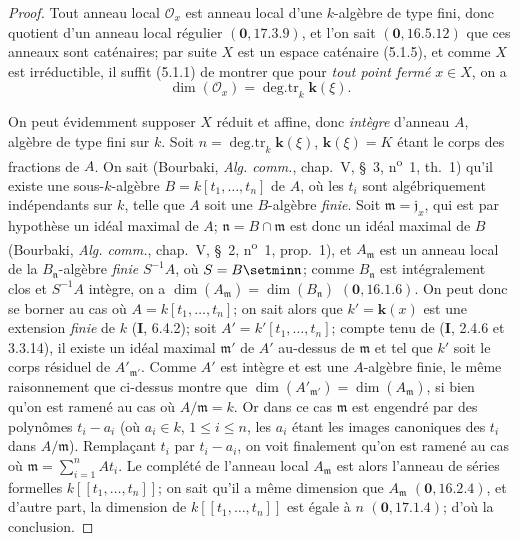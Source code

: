 \begin{proof}
Tout anneau local $\mathcal O_x$ est anneau local d'une $k$-algèbre de type
fini, donc quotient d'un anneau local régulier $(\mathbf{0},17.3.9)$, et l'on sait
$(\mathbf{0},16.5.12)$ que ces anneaux sont caténaires; par suite $X$ est un espace
caténaire (5.1.5), et comme $X$ est irréductible, il suffit (5.1.1) de montrer
que pour \emph{tout point fermé} $x\in X$, on a
\begin{equation}
\dim(\mathcal O_x)=\operatorname{deg.tr}_k \boldsymbol{k}(\xi).
\tag{5.2.1.1}\label{IV.2.5.2.1.1-fr}
\end{equation}

On peut évidemment supposer $X$ réduit et affine, donc \emph{intègre}
d'anneau $A$, algèbre de type fini sur $k$. Soit
$n=\operatorname{deg.tr}_k \boldsymbol{k}(\xi)$, $\boldsymbol{k}(\xi)=K$ étant le corps des fractions
de $A$. On sait (Bourbaki, \emph{Alg. comm.}, chap.~V, \S~3,
n\textsuperscript{o}~1, th.~1) qu'il existe une sous-$k$-algèbre
$B=k[t_1,\ldots,t_n]$ de $A$, où les $t_i$ sont algébriquement indépendants
sur $k$, telle que $A$ soit une $B$-algèbre \emph{finie}. Soit
$\mathfrak m=\mathfrak j_x$, qui est par hypothèse un idéal maximal de $A$;
$\mathfrak n=B\cap\mathfrak m$ est donc un idéal maximal de $B$ (Bourbaki,
\emph{Alg. comm.}, chap.~V, \S~2, n\textsuperscript{o}~1, prop.~1), et
$A_{\mathfrak m}$ est un anneau local de la $B_{\mathfrak n}$-algèbre
\emph{finie} $S^{-1}A$, où $S=B\setmin\mathfrak n$; comme $B_{\mathfrak n}$ est
intégralement clos et $S^{-1}A$ intègre, on a
$\dim(A_{\mathfrak m})=\dim(B_{\mathfrak n})$ $(\mathbf{0},16.1.6)$. On peut donc se
borner au cas où $A=k[t_1,\ldots,t_n]$; on sait alors que
$k'=\boldsymbol{k}(x)$ est une extension \emph{finie} de $k$ (\textbf{I}, 6.4.2); soit
$A'=k'[t_1,\ldots,t_n]$; compte tenu de (\textbf{I}, 2.4.6 et 3.3.14), il existe un
idéal maximal $\mathfrak m'$ de $A'$ au-dessus de $\mathfrak m$ et tel que
$k'$ soit le corps résiduel de $A'_{\mathfrak m'}$. Comme $A'$ est intègre et
est une $A$-algèbre finie, le même raisonnement que ci-dessus montre que
$\dim(A'_{\mathfrak m'})=\dim(A_{\mathfrak m})$, si bien qu'on est ramené au
cas où $A/\mathfrak m=k$. Or dans ce cas $\mathfrak m$ est engendré par des
polynômes $t_i-a_i$ (où $a_i\in k$, $1\leq i\leq n$, les $a_i$ étant les
images canoniques des $t_i$ dans $A/\mathfrak m$). Remplaçant $t_i$ par
$t_i-a_i$, on voit finalement qu'on est ramené au cas où
$\mathfrak m=\sum_{i=1}^nAt_i$. Le complété de l'anneau local
$A_{\mathfrak m}$ est alors l'anneau de séries formelles
$k[[t_1,\ldots,t_n]]$; on sait qu'il a même dimension que $A_{\mathfrak m}$
$(\mathbf{0},16.2.4)$, et d'autre part, la dimension de $k[[t_1,\ldots,t_n]]$ est égale
à $n$ $(\mathbf{0},17.1.4)$; d'où la conclusion.
\end{proof}

